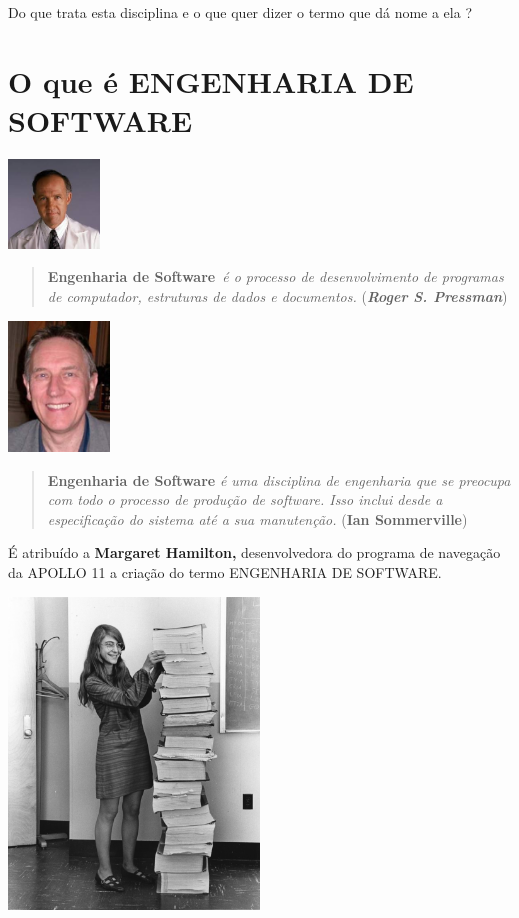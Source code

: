 \documentclass[
]{book}
\begin{document}
Do que trata esta disciplina e o que quer dizer o termo que dá nome a ela ?

\section{O que é ENGENHARIA DE SOFTWARE}\label{o-que-uxe9-engenharia-de-software}

\includegraphics[width=0.95833in,height=\textheight]{images/pressman.jpg}

\begin{quote}
\textbf{Engenharia de Software}~\emph{é o processo de desenvolvimento de programas de computador, estruturas de dados e documentos.} (\textbf{\emph{Roger S. Pressman}})
\end{quote}

\includegraphics[width=1.0625in,height=\textheight]{images/sommerville.jpg}

\begin{quote}
\textbf{Engenharia de Software} \emph{é uma disciplina de engenharia que se preocupa com todo o processo de produção de software. Isso inclui desde a especificação do sistema até a sua manutenção.} (\textbf{Ian Sommerville})
\end{quote}

É atribuído a \textbf{Margaret Hamilton,} desenvolvedora do programa de navegação da APOLLO 11 a criação do termo ENGENHARIA DE SOFTWARE.

\includegraphics[width=0.5\textwidth,height=\textheight]{images/Margaret_Hamilton.jpg}
\end{document}

